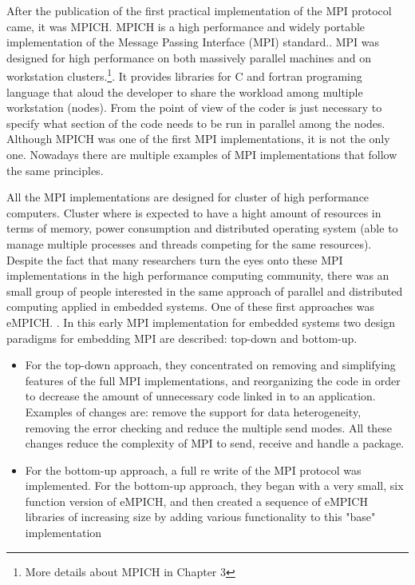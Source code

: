 
After the publication of \cite{Salim} the first practical implementation of the
MPI protocol came, it was MPICH. MPICH is a high performance and widely portable
implementation of the Message Passing Interface (MPI) standard.\cite{Gropp}.
MPI was designed for high performance on both massively parallel machines and
on workstation clusters.\footnote{More details about MPICH in Chapter 3}. It
provides libraries for C and fortran programing language that aloud the
developer to share the workload among multiple workstation (nodes). From the
point of view of the coder  is just necessary to specify what section of the
code needs to be run in parallel among the nodes. Although MPICH was one of the
first MPI implementations, it is not the only one. Nowadays there are multiple
examples of MPI implementations that follow the same principles.


All the MPI implementations are designed for cluster of high performance
computers. Cluster where is expected to have a hight amount of resources in
terms of memory, power consumption and distributed operating system (able to
manage multiple processes and threads competing for the same resources).
Despite the fact that many researchers turn the eyes onto these MPI
implementations in the high performance
computing community, there was an small group of people interested in the same
approach of parallel and distributed computing applied in embedded systems. One
of these first approaches was eMPICH.  \cite{McMahon}. In this early MPI
implementation for embedded systems  two design paradigms for embedding MPI are
described: top-down and bottom-up.

\begin{itemize}
\item For the top-down approach, they concentrated on removing and simplifying
features of the full MPI implementations, and reorganizing the code in order to
decrease the amount of unnecessary code linked in to an application. Examples
of changes are: remove the support for data heterogeneity, removing the error
checking and reduce the multiple send modes. All these changes reduce the
complexity of MPI to send, receive and handle a package.

\item For the bottom-up approach, a full re write of the MPI protocol was
implemented. For the bottom-up approach, they began with a very small, six
function version of eMPICH, and then created a sequence of eMPICH libraries
of increasing size by adding various functionality to this "base" implementation
\end{itemize}


